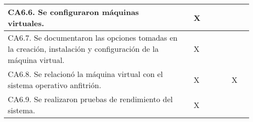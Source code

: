 \documentclass[a4paper,oneside,titlepage,12pt]{article}
\begin{document}
\begin{tabularx}{\textwidth}{| X | M{0.5cm} | M{0.5cm} | M{0.5cm} | M{0.5cm} | M{0.5cm} | M{0.5cm} | m{5cm} |}
    \quad CA6.6. Se configuraron máquinas virtuales. &  & X &  &  &  &  & \\\hline
    
    \quad CA6.7. Se documentaron las opciones tomadas en la creación, instalación y configuración de la máquina virtual. &  & X &  &  &  &  & \\\hline
    
    \quad CA6.8. Se relacionó la máquina virtual con el sistema operativo anfitrión. &  & X &  &  &  & X & \\\hline
    
    \quad CA6.9. Se realizaron pruebas de rendimiento del sistema. &  & X &  &  &  &  & \\\hline
    
    
\end{tabularx}

\printbibliography
\end{document}

